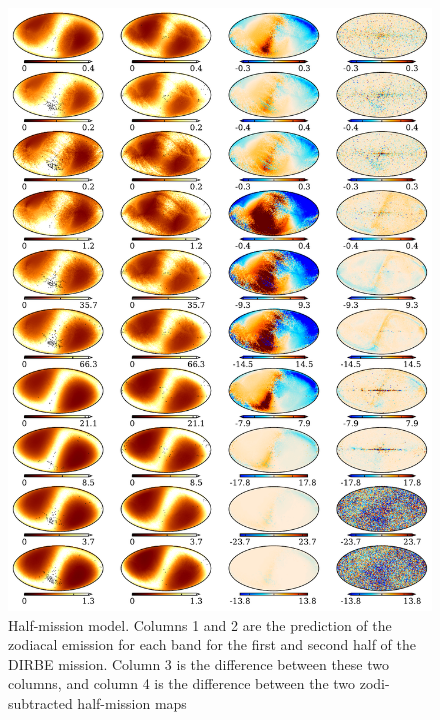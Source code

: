 \documentclass{aa}
\begin{document}
\begin{figure}
	\centering
	\includegraphics[width=0.8\linewidth]{figs/zodi_diff.pdf}
	\caption{Half-mission model. Columns 1 and 2 are the prediction of the zodiacal emission for each band for the first and second half of the DIRBE mission. Column 3 is the difference between these two columns, and column 4 is the difference between the two zodi-subtracted half-mission maps}
	\label{fig: zodi_HM}
\end{figure}
\end{document}
